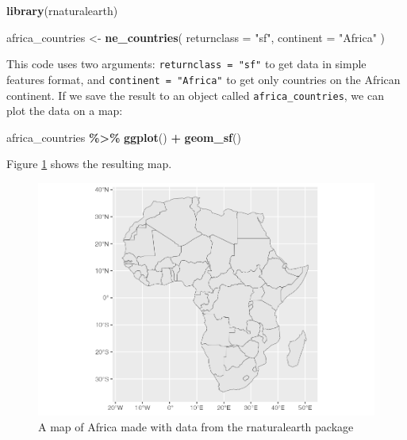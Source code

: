 \documentclass[
]{book}
\newenvironment{Shaded}{\begin{snugshade}}{\end{snugshade}}
\newcommand{\AttributeTok}[1]{\textcolor[rgb]{0.13,0.29,0.53}{#1}}
\newcommand{\FunctionTok}[1]{\textcolor[rgb]{0.13,0.29,0.53}{\textbf{#1}}}
\newcommand{\NormalTok}[1]{#1}
\newcommand{\OtherTok}[1]{\textcolor[rgb]{0.56,0.35,0.01}{#1}}
\newcommand{\SpecialCharTok}[1]{\textcolor[rgb]{0.81,0.36,0.00}{\textbf{#1}}}
\newcommand{\StringTok}[1]{\textcolor[rgb]{0.31,0.60,0.02}{#1}}
\begin{document}
\begin{Shaded}
\begin{Highlighting}[]
\FunctionTok{library}\NormalTok{(rnaturalearth)}

\NormalTok{africa\_countries }\OtherTok{\textless{}{-}} \FunctionTok{ne\_countries}\NormalTok{(}
  \AttributeTok{returnclass =} \StringTok{"sf"}\NormalTok{,}
  \AttributeTok{continent =} \StringTok{"Africa"}
\NormalTok{)}
\end{Highlighting}
\end{Shaded}

This code uses two arguments: \texttt{returnclass\ =\ "sf"} to get data in simple features format, and \texttt{continent\ =\ "Africa"} to get only countries on the African continent. If we save the result to an object called \texttt{africa\_countries}, we can plot the data on a map:

\begin{Shaded}
\begin{Highlighting}[]
\NormalTok{africa\_countries }\SpecialCharTok{\%\textgreater{}\%}
  \FunctionTok{ggplot}\NormalTok{() }\SpecialCharTok{+}
  \FunctionTok{geom\_sf}\NormalTok{()}
\end{Highlighting}
\end{Shaded}

Figure \ref{fig:africa-map} shows the resulting map.

\begin{figure}
\includegraphics[width=1\linewidth]{maps_files/figure-latex/africa-map-1} \caption{A map of Africa made with data from the rnaturalearth package}\label{fig:africa-map}
\end{figure}
\end{document}
